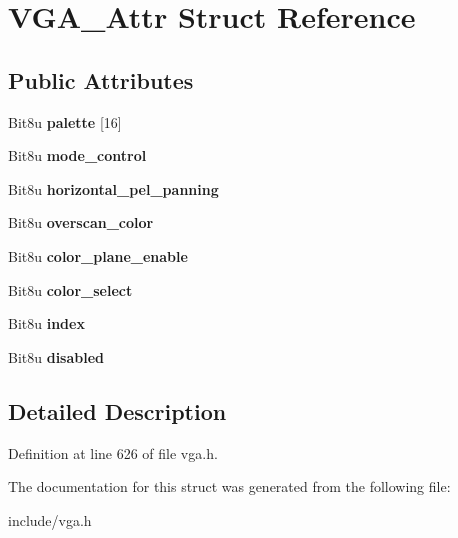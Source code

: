 \hypertarget{structVGA__Attr}{\section{V\-G\-A\-\_\-\-Attr Struct Reference}
\label{structVGA__Attr}
}
\subsection*{Public Attributes}
\begin{DoxyCompactItemize}
\item 
\hypertarget{structVGA__Attr_ad99b88df8836cef9a71a302eef58c6bc}{Bit8u {\bfseries palette} \mbox{[}16\mbox{]}}\label{structVGA__Attr_ad99b88df8836cef9a71a302eef58c6bc}

\item 
\hypertarget{structVGA__Attr_a1b1f9b873cb25af5b2258157ec294b67}{Bit8u {\bfseries mode\-\_\-control}}\label{structVGA__Attr_a1b1f9b873cb25af5b2258157ec294b67}

\item 
\hypertarget{structVGA__Attr_a57f5441e85ade86c8ac8a47db2eee8a6}{Bit8u {\bfseries horizontal\-\_\-pel\-\_\-panning}}\label{structVGA__Attr_a57f5441e85ade86c8ac8a47db2eee8a6}

\item 
\hypertarget{structVGA__Attr_a8728e17ec288d51e4b915af094916daa}{Bit8u {\bfseries overscan\-\_\-color}}\label{structVGA__Attr_a8728e17ec288d51e4b915af094916daa}

\item 
\hypertarget{structVGA__Attr_a87dc770222aa6ab0f30f1dd2288be390}{Bit8u {\bfseries color\-\_\-plane\-\_\-enable}}\label{structVGA__Attr_a87dc770222aa6ab0f30f1dd2288be390}

\item 
\hypertarget{structVGA__Attr_abf6a172f77c5af11b8fe91047af55b98}{Bit8u {\bfseries color\-\_\-select}}\label{structVGA__Attr_abf6a172f77c5af11b8fe91047af55b98}

\item 
\hypertarget{structVGA__Attr_a068d49ae844631d0e0863fbaa6c82df4}{Bit8u {\bfseries index}}\label{structVGA__Attr_a068d49ae844631d0e0863fbaa6c82df4}

\item 
\hypertarget{structVGA__Attr_a6c14506b028f7cdc1b0b57bd2bbf57e2}{Bit8u {\bfseries disabled}}\label{structVGA__Attr_a6c14506b028f7cdc1b0b57bd2bbf57e2}

\end{DoxyCompactItemize}


\subsection{Detailed Description}


Definition at line 626 of file vga.\-h.



The documentation for this struct was generated from the following file\-:\begin{DoxyCompactItemize}
\item 
include/vga.\-h\end{DoxyCompactItemize}
